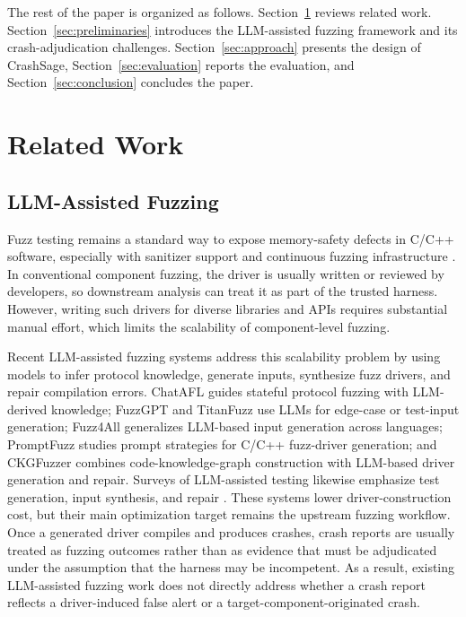 \documentclass[pdflatex,sn-basic]{sn-jnl}%
\theoremstyle{thmstyleone}%
\theoremstyle{thmstyletwo}%
\theoremstyle{thmstylethree}%
\begin{document}
The rest of the paper is organized as follows. Section~\ref{sec:related-work} reviews related work. Section~\ref{sec:preliminaries} introduces the LLM-assisted fuzzing framework and its crash-adjudication challenges. Section~\ref{sec:approach} presents the design of CrashSage, Section~\ref{sec:evaluation} reports the evaluation, and Section~\ref{sec:conclusion} concludes the paper.


\section{Related Work}
\label{sec:related-work}

\subsection{LLM-Assisted Fuzzing}

Fuzz testing remains a standard way to expose memory-safety defects in C/C++ software, especially with sanitizer support and continuous fuzzing infrastructure \citep{ref16,ref17,ref18,ref19,ref7}. In conventional component fuzzing, the driver is usually written or reviewed by developers, so downstream analysis can treat it as part of the trusted harness. However, writing such drivers for diverse libraries and APIs requires substantial manual effort, which limits the scalability of component-level fuzzing.

Recent LLM-assisted fuzzing systems address this scalability problem by using models to infer protocol knowledge, generate inputs, synthesize fuzz drivers, and repair compilation errors. ChatAFL \citep{ref8} guides stateful protocol fuzzing with LLM-derived knowledge; FuzzGPT \citep{ref9} and TitanFuzz \citep{ref10} use LLMs for edge-case or test-input generation; Fuzz4All \citep{ref11} generalizes LLM-based input generation across languages; PromptFuzz \citep{ref13} studies prompt strategies for C/C++ fuzz-driver generation; and CKGFuzzer \citep{ref12} combines code-knowledge-graph construction with LLM-based driver generation and repair. Surveys of LLM-assisted testing likewise emphasize test generation, input synthesis, and repair \citep{ref27}. These systems lower driver-construction cost, but their main optimization target remains the upstream fuzzing workflow. Once a generated driver compiles and produces crashes, crash reports are usually treated as fuzzing outcomes rather than as evidence that must be adjudicated under the assumption that the harness may be incompetent. As a result, existing LLM-assisted fuzzing work does not directly address whether a crash report reflects a driver-induced false alert or a target-component-originated crash.
\end{document}
